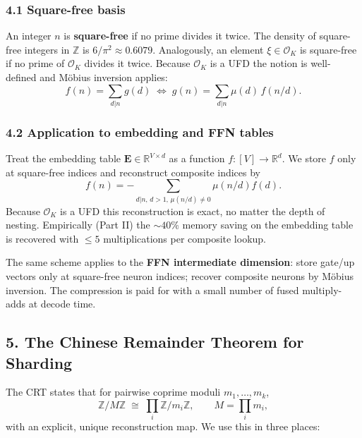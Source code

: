 \documentclass[
  11pt,
]{article}
\begin{document}
\hypertarget{square-free-basis}{%
\subsubsection{4.1 Square-free basis}\label{square-free-basis}}

An integer \(n\) is \textbf{square-free} if no prime divides it twice.
The density of square-free integers in \(\mathbb{Z}\) is
\(6/\pi^2 \approx 0.6079\). Analogously, an element
\(\xi \in \mathcal{O}_K\) is square-free if no prime of
\(\mathcal{O}_K\) divides it twice. Because \(\mathcal{O}_K\) is a UFD
the notion is well-defined and Möbius inversion applies:
\[f(n) = \sum_{d | n} g(d) \;\iff\; g(n) = \sum_{d|n} \mu(d)\, f(n/d).\]

\hypertarget{application-to-embedding-and-ffn-tables}{%
\subsubsection{4.2 Application to embedding and FFN
tables}\label{application-to-embedding-and-ffn-tables}}

Treat the embedding table \(\mathbf{E} \in \mathbb{R}^{V\times d}\) as a
function \(f: [V] \to \mathbb{R}^d\). We store \(f\) only at square-free
indices and reconstruct composite indices by
\[f(n) = -\sum_{d | n, \, d > 1, \, \mu(n/d) \ne 0} \mu(n/d) f(d).\]
Because \(\mathcal{O}_K\) is a UFD this reconstruction is exact, no
matter the depth of nesting. Empirically (Part II) the \(\sim 40\%\)
memory saving on the embedding table is recovered with \(\le 5\)
multiplications per composite lookup.

The same scheme applies to the \textbf{FFN intermediate dimension}:
store gate/up vectors only at square-free neuron indices; recover
composite neurons by Möbius inversion. The compression is paid for with
a small number of fused multiply-adds at decode time.

\hypertarget{the-chinese-remainder-theorem-for-sharding}{%
\subsection{5. The Chinese Remainder Theorem for
Sharding}\label{the-chinese-remainder-theorem-for-sharding}}

The CRT states that for pairwise coprime moduli \(m_1, \dots, m_k\),
\[\mathbb{Z}/M\mathbb{Z} \;\cong\; \prod_i \mathbb{Z}/m_i\mathbb{Z}, \qquad M = \prod_i m_i,\]
with an explicit, unique reconstruction map. We use this in three
places:
\end{document}
